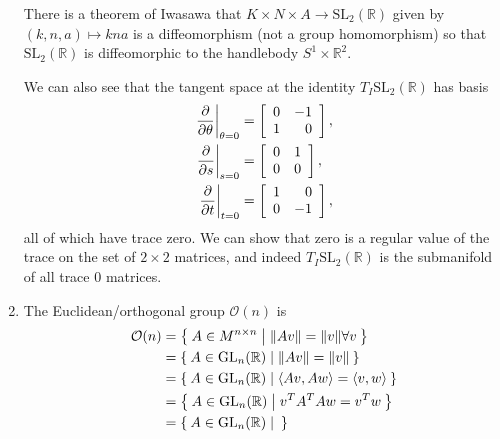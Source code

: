 \begin{xmpl}
\begin{enumerate}
{      There is a theorem of Iwasawa that
      $K \times N \times A \to \mathrm{SL}_2(\mathbb{R})$ given by
      $(k, n, a) \mapsto k n a$ is a diffeomorphism (not a
      group homomorphism) so that
      $\mathrm{SL}_2(\mathbb{R})$ is diffeomorphic to the handlebody
      $S^1 \times \mathbb{R}^2$.

      We can also see that the tangent space at the identity
      $T_I \mathrm{SL}_2(\mathbb{R})$ has basis
      \begin{align*}
        \left.\frac{\partial}{\partial \theta}\right|_{\theta = 0}
      &= \left[
           \begin{array}{r r}
             0 & -1 \\
             1 &  0
           \end{array}
         \right], \\
         \left.\frac{\partial}{\partial s}\right|_{s = 0}
      &= \left[
           \begin{array}{r r}
             0 &  1 \\
             0 &  0
           \end{array}
         \right], \\
      \left.\frac{\partial}{\partial t}\right|_{t = 0}
      &= \left[
           \begin{array}{r r}
             1 &  0 \\
             0 & -1
           \end{array}
         \right],
      \end{align*}
      all of which have trace zero. We can show that zero is a regular
      value of the trace on the set of $2 \times 2$ matrices, and
      indeed $T_I \mathrm{SL}_2(\mathbb{R})$ is the submanifold of all
      trace 0 matrices.
    }
    \item{
      The Euclidean/orthogonal group $\mathcal{O}(n)$ is
      \begin{align*}
         \mathcal{O}(n)
      &= \Set{ A \in M^{n \times n} | \| A v \| = \| v \| \forall v
         } \\
      &= \Set{ A \in \mathrm{GL}_n(\mathbb{R}) |
            \| A v \| = \| v \|
         } \\
      &= \Set{ A \in \mathrm{GL}_n(\mathbb{R}) |
            \langle A v, A w \rangle = \langle v, w \rangle
         } \\
      &= \Set{ A \in \mathrm{GL}_n(\mathbb{R}) |
            v^T A^T A w = v^T w
         } \\
      &= \Set{ A \in \mathrm{GL}_n(\mathbb{R}) |
}
\end{align*}}
\end{enumerate}
\end{xmpl}
